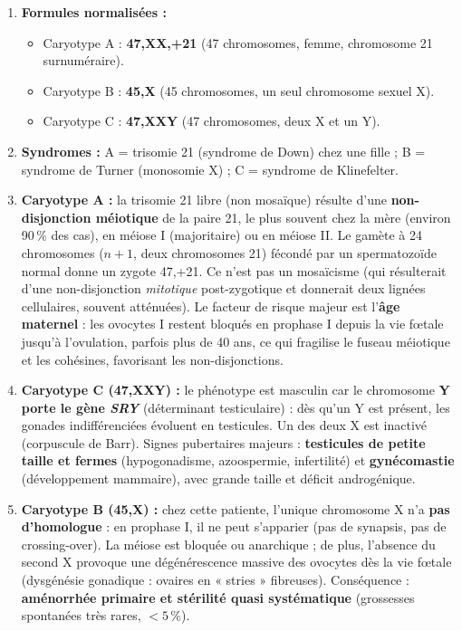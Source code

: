\documentclass[11pt]{article}
\begin{document}
\begin{corrige}
\begin{enumerate}
    \item \textbf{Formules normalisées :}
    \begin{itemize}
        \item Caryotype A : \textbf{47,XX,+21} (47 chromosomes, femme, chromosome 21 surnuméraire).
        \item Caryotype B : \textbf{45,X} (45 chromosomes, un seul chromosome sexuel X).
        \item Caryotype C : \textbf{47,XXY} (47 chromosomes, deux X et un Y).
    \end{itemize}
    \item \textbf{Syndromes :} A = trisomie 21 (syndrome de Down) chez une fille ; B = syndrome de Turner (monosomie X) ; C = syndrome de Klinefelter.
    \item \textbf{Caryotype A :} la trisomie 21 libre (non mosaïque) résulte d'une \textbf{non-disjonction méiotique} de la paire 21, le plus souvent chez la mère (environ 90\,\% des cas), en méiose I (majoritaire) ou en méiose II. Le gamète à 24 chromosomes ($n+1$, deux chromosomes 21) fécondé par un spermatozoïde normal donne un zygote 47,+21. Ce n'est pas un mosaïcisme (qui résulterait d'une non-disjonction \emph{mitotique} post-zygotique et donnerait deux lignées cellulaires, souvent atténuées). Le facteur de risque majeur est l'\textbf{âge maternel} : les ovocytes I restent bloqués en prophase I depuis la vie fœtale jusqu'à l'ovulation, parfois plus de 40 ans, ce qui fragilise le fuseau méiotique et les cohésines, favorisant les non-disjonctions.
    \item \textbf{Caryotype C (47,XXY) :} le phénotype est masculin car le chromosome \textbf{Y porte le gène \emph{SRY}} (déterminant testiculaire) : dès qu'un Y est présent, les gonades indifférenciées évoluent en testicules. Un des deux X est inactivé (corpuscule de Barr). Signes pubertaires majeurs : \textbf{testicules de petite taille et fermes} (hypogonadisme, azoospermie, infertilité) et \textbf{gynécomastie} (développement mammaire), avec grande taille et déficit androgénique.
    \item \textbf{Caryotype B (45,X) :} chez cette patiente, l'unique chromosome X n'a \textbf{pas d'homologue} : en prophase I, il ne peut s'apparier (pas de synapsis, pas de crossing-over). La méiose est bloquée ou anarchique ; de plus, l'absence du second X provoque une dégénérescence massive des ovocytes dès la vie fœtale (dysgénésie gonadique : ovaires en « stries » fibreuses). Conséquence : \textbf{aménorrhée primaire et stérilité quasi systématique} (grossesses spontanées très rares, $<5\,\%$).
\end{enumerate}
\end{corrige}
\end{document}
